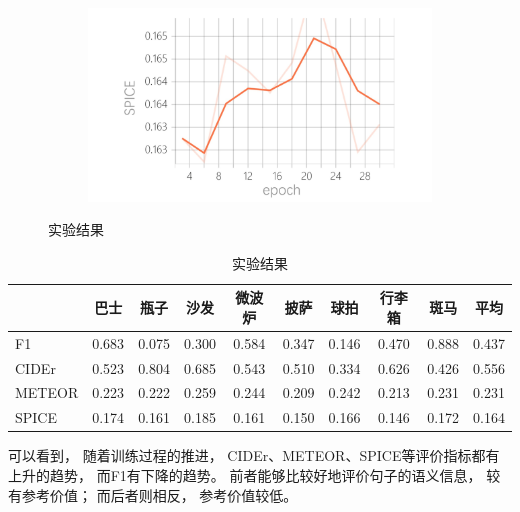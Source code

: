 \documentclass[12pt]{article}
\begin{document}
\begin{figure}[h]
\begin{subfigure}{0.49\textwidth}
	\end{subfigure}
	\begin{subfigure}{0.49\textwidth}
		\includegraphics[width=\linewidth]{Plot/SPICE.png}
	\end{subfigure}
	\caption{实验结果}
	\label{fig:result}
\end{figure}

\begin{table}[h]
	\centering
	\begin{tabular}{|l|cccccccc|c|} 
		\hline
		& 巴士 & 瓶子 & 沙发 & 微波炉
		& 披萨 & 球拍 & 行李箱 & 斑马 & 平均 \\
		\hline
		F1 & 0.683 & 0.075 & 0.300 & 0.584
		& 0.347 & 0.146 & 0.470 & 0.888 & 0.437 \\
		CIDEr & 0.523 & 0.804 & 0.685 & 0.543 
		& 0.510 & 0.334 & 0.626 & 0.426 & 0.556 \\
		METEOR & 0.223 & 0.222 & 0.259 & 0.244 
		& 0.209 & 0.242 & 0.213 & 0.231 & 0.231 \\
		SPICE & 0.174 & 0.161 & 0.185 & 0.161 
		& 0.150 & 0.166 & 0.146 & 0.172 & 0.164 \\
		\hline
	\end{tabular}
	\caption{实验结果}
	\label{tab:result}
\end{table}

可以看到，
随着训练过程的推进，
CIDEr、METEOR、SPICE等评价指标都有上升的趋势，
而F1有下降的趋势。
前者能够比较好地评价句子的语义信息，
较有参考价值；
而后者则相反，
参考价值较低。
\end{document}
